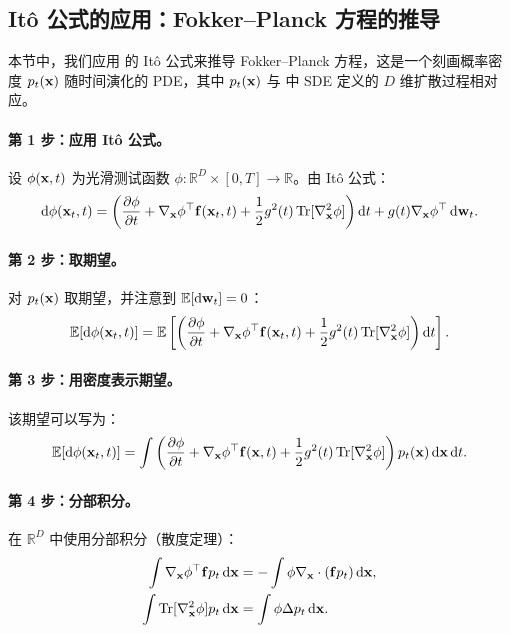 



\subsection{It\^o 公式的应用：Fokker–Planck 方程的推导}\label{subsec:rigorous-proof-fpe}
本节中，我们应用  的 It\^o 公式来推导 Fokker–Planck 方程，这是一个刻画概率密度 $ p_t({\mathbf{x}}) $ 随时间演化的 PDE，其中 $ p_t({\mathbf{x}}) $ 与  中 SDE 定义的 $ D $ 维扩散过程相对应。

\paragraph{第 1 步：应用 It\^o 公式。}
设 $\phi({\mathbf{x}}, t)$ 为光滑测试函数 $\phi \colon \mathbb{R}^D \times [0, T] \to \mathbb{R}$。由 It\^o 公式：
\[
\mathop{}\!\mathrm{d} \phi({\mathbf{x}}_t, t) = \left( \frac{\partial \phi}{\partial t} + \nabla_{{\mathbf{x}}} \phi^\top {\mathbf{f}}({\mathbf{x}}_t, t) + \frac{1}{2} g^2(t) \operatorname{Tr}[\nabla_{{\mathbf{x}}}^2 \phi] \right) \mathop{}\!\mathrm{d} t + g(t) \nabla_{{\mathbf{x}}} \phi^\top \mathop{}\!\mathrm{d} {\mathbf{w}}_t.
\]
\paragraph{第 2 步：取期望。}
对 $p_t({\mathbf{x}})$ 取期望，并注意到 $\mathbb{E}[\mathop{}\!\mathrm{d} {\mathbf{w}}_t] = 0$：
\[
\mathbb{E}[\mathop{}\!\mathrm{d} \phi({\mathbf{x}}_t, t)] = \mathbb{E} \left[ \left( \frac{\partial \phi}{\partial t} + \nabla_{{\mathbf{x}}} \phi^\top {\mathbf{f}}({\mathbf{x}}_t, t) + \frac{1}{2} g^2(t) \operatorname{Tr}[\nabla_{{\mathbf{x}}}^2 \phi] \right) \mathop{}\!\mathrm{d} t \right].
\]
\paragraph{第 3 步：用密度表示期望。}
该期望可以写为：
\[
\mathbb{E}[\mathop{}\!\mathrm{d} \phi({\mathbf{x}}_t, t)] = \int \left( \frac{\partial \phi}{\partial t} + \nabla_{{\mathbf{x}}} \phi^\top {\mathbf{f}}({\mathbf{x}}, t) + \frac{1}{2} g^2(t) \operatorname{Tr}[\nabla_{{\mathbf{x}}}^2 \phi] \right) p_t({\mathbf{x}}) \mathop{}\!\mathrm{d} {\mathbf{x}} \mathop{}\!\mathrm{d} t.
\]
\paragraph{第 4 步：分部积分。}
在 $\mathbb{R}^D$ 中使用分部积分（散度定理）：
\begin{align*}
    \int \nabla_{{\mathbf{x}}} \phi^\top {\mathbf{f}} p_t \mathop{}\!\mathrm{d} {\mathbf{x}} &= -\int \phi \nabla_{{\mathbf{x}}} \cdot ({\mathbf{f}} p_t) \mathop{}\!\mathrm{d} {\mathbf{x}}, \\
    \int \operatorname{Tr}[\nabla_{{\mathbf{x}}}^2 \phi] p_t  \mathop{}\!\mathrm{d} {\mathbf{x}} &= \int \phi \Delta p_t \mathop{}\!\mathrm{d} {\mathbf{x}}.
\end{align*}
